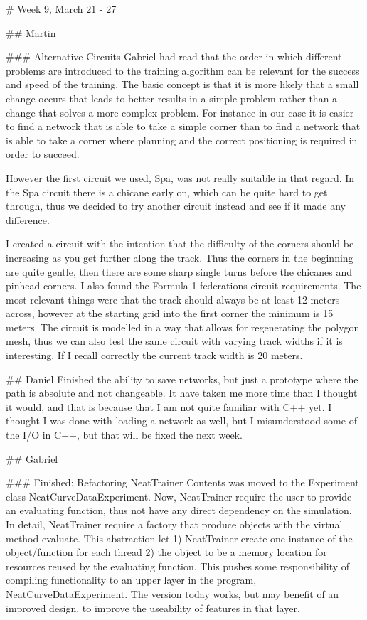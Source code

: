 # Week 9, March 21 - 27


## Martin

### Alternative Circuits
Gabriel had read that the order in which different problems are introduced to the training algorithm can be relevant for the success and speed of the training. The basic concept is that it is more likely that a small change occurs that leads to better results in a simple problem rather than a change that solves a more complex problem. For instance in our case it is easier to find a network that is able to take a simple corner than to find a network that is able to take a corner where planning and the correct positioning is required in order to succeed. 

However the first circuit we used, Spa, was not really suitable in that regard. In the Spa circuit there is a chicane early on, which can be quite hard to get through, thus we decided to try another circuit instead and see if it made any difference. 

I created a circuit with the intention that the difficulty of the corners should be increasing as you get further along the track. Thus the corners in the beginning are quite gentle, then there are some sharp single turns before the chicanes and pinhead corners. I also found the Formula 1 federations circuit requirements. The most relevant things were that the track should always be at least 12 meters across, however at the starting grid into the first corner the minimum is 15 meters. The circuit is modelled in a way that allows for regenerating the polygon mesh, thus we can also test the same circuit with varying track widths if it is interesting. If I recall correctly the current track width is 20 meters. 


## Daniel 
Finished the ability to save networks, but just a prototype where the path is absolute and not changeable. It have taken me more time than I thought it would, and that is because that I am not quite familiar with C++ yet. I thought I was done with loading a network as well, but I misunderstood some of the I/O in C++, but that will be fixed the next week. 


## Gabriel

### Finished: Refactoring NeatTrainer
Contents was moved to the Experiment class NeatCurveDataExperiment.
Now, NeatTrainer require the user to provide an evaluating function, thus not have any direct dependency on the simulation. In detail, NeatTrainer require a factory that produce objects with the virtual method evaluate. This abstraction let 1) NeatTrainer create one instance of the object/function for each thread 2) the object to be a memory location for resources reused by the evaluating function.
This pushes some responsibility of compiling functionality to an upper layer in the program, NeatCurveDataExperiment. The version today works, but may benefit of an improved design, to improve the useability of features in that layer.
